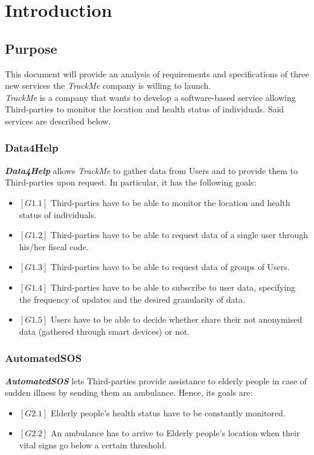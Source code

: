 \chapter{Introduction}

\section{Purpose}
    This document will provide an analysis of requirements and specifications of three new services the \emph{TrackMe} company is willing to launch.\\
    \emph{TrackMe} is a company that wants to develop a software-based service allowing Third-parties to monitor the location and health status of individuals.
    Said services are described below.

\subsection{Data4Help}
    \textbf{\emph{Data4Help}} allows \emph{TrackMe} to gather data from Users and to provide them to Third-parties upon request. In particular, it has the following goals:
    \begin{itemize}
        \item $[G1.1]$ Third-parties have to be able to monitor the location and health status of individuals.
        \item $[G1.2]$ Third-parties have to be able to request data of a single user through his/her fiscal code.
        \item $[G1.3]$ Third-parties have to be able to request data of groups of Users.
        \item $[G1.4]$ Third-parties have to be able to subscribe to user data, specifying the frequency of updates and the desired granularity of data.
        \item $[G1.5]$ Users have to be able to decide whether share their not anonymised data (gathered through smart devices) or not.
    \end{itemize}

\subsection{AutomatedSOS}    
    \textbf{\emph{AutomatedSOS}} lets Third-parties provide assistance to elderly people in case of sudden illness by sending them an ambulance. Hence, its goals are:
    \begin{itemize}
        \item $[G2.1]$ Elderly people's health status have to be constantly monitored.
        \item $[G2.2]$ An ambulance has to arrive to Elderly people's location when their vital signs go below a certain threshold.
    \end{itemize}
    
